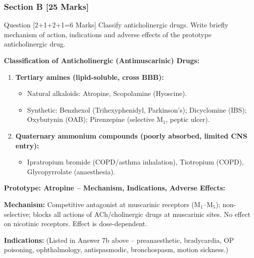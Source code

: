 \documentclass[11pt,a4paper]{article}
\begin{document}
\subsubsection{Section B [25 Marks]}

\begin{qbox}{Question [2+1+2+1=6 Marks]}
Classify anticholinergic drugs. Write briefly mechanism of action, indications and adverse effects of the prototype anticholinergic drug.
\end{qbox}

\begin{ansbox}
\textbf{Classification of Anticholinergic (Antimuscarinic) Drugs:}
\begin{enumerate}[leftmargin=*]
    \item \textbf{Tertiary amines (lipid-soluble, cross BBB):}
    \begin{itemize}
        \item Natural alkaloids: Atropine, Scopolamine (Hyoscine).
        \item Synthetic: Benzhexol (Trihexyphenidyl, Parkinson's); Dicyclomine (IBS); Oxybutynin (OAB); Pirenzepine (selective M$_1$, peptic ulcer).
    \end{itemize}
    \item \textbf{Quaternary ammonium compounds (poorly absorbed, limited CNS entry):}
    \begin{itemize}
        \item Ipratropium bromide (COPD/asthma inhalation), Tiotropium (COPD), Glycopyrrolate (anaesthesia).
    \end{itemize}
\end{enumerate}

\textbf{Prototype: Atropine -- Mechanism, Indications, Adverse Effects:}

\textbf{Mechanism:} Competitive antagonist at muscarinic receptors (M$_1$--M$_5$); non-selective; blocks all actions of ACh/cholinergic drugs at muscarinic sites. No effect on nicotinic receptors. Effect is dose-dependent.

\textbf{Indications:} (Listed in Answer 7b above -- preanaesthetic, bradycardia, OP poisoning, ophthalmology, antispasmodic, bronchospasm, motion sickness.)


\end{ansbox}
\end{document}
